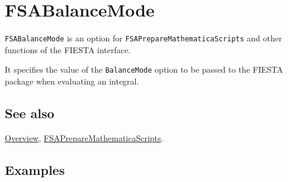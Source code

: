 \documentclass[../FeynHelpersManual.tex]{subfiles}
\begin{document}
\begin{Shaded}
\begin{Highlighting}[]
 
\end{Highlighting}
\end{Shaded}

\hypertarget{fsabalancemode}{
\section{FSABalanceMode}\label{fsabalancemode}}

\texttt{FSABalanceMode} is an option for
\texttt{FSAPrepareMathematicaScripts} and other functions of the FIESTA
interface.

It specifies the value of the \texttt{BalanceMode} option to be passed
to the FIESTA package when evaluating an integral.

\subsection{See also}

\hyperlink{toc}{Overview},
\hyperlink{fsapreparemathematicascripts}{FSAPrepareMathematicaScripts}.

\subsection{Examples}
\end{document}
